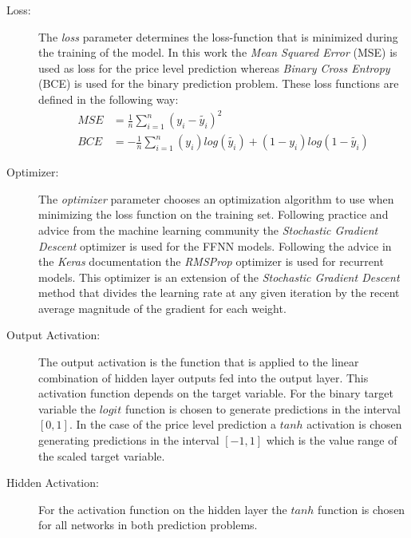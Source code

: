 \begin{description}
\item[Loss:] The \textit{loss} parameter determines the loss-function that is minimized during the training of the model. In this work the \textit{Mean Squared Error} (MSE) is used as loss for the price level prediction whereas \textit{Binary Cross Entropy} (BCE) is used for the binary prediction problem. These loss functions are defined in the following way: \begin{align*}
MSE &= \frac{1}{n}\sum_{i=1}^{n}(y_i - \tilde{y_i})^2 \\
BCE &= -\frac{1}{n}\sum_{i=1}^{n}(y_i)log(\tilde{y_i}) + (1-y_i)log(1-\tilde{y_i})
\end{align*}

\item[Optimizer:] The \textit{optimizer} parameter chooses an optimization algorithm to use when minimizing the loss function on the training set. Following practice and advice from the machine learning community the \textit{Stochastic Gradient Descent} optimizer is used for the FFNN models. Following the advice in the \textit{Keras} documentation the \textit{RMSProp} optimizer is used for recurrent models. This optimizer is an extension of the \textit{Stochastic Gradient Descent} method that divides the learning rate at any given iteration by the recent average magnitude of the gradient for each weight.

\item[Output Activation:] The output activation is the function that is applied to the linear combination of hidden layer outputs fed into the output layer. This activation function depends on the target variable. For the binary target variable the $logit$ function is chosen to generate predictions in the interval $[0,1]$. In the case of the price level prediction a $tanh$ activation is chosen generating predictions in the interval $[-1,1]$ which is the value range of the scaled target variable.

\item[Hidden Activation:] For the activation function on the hidden layer the $tanh$ function is chosen for all networks in both prediction problems.
\end{description}
